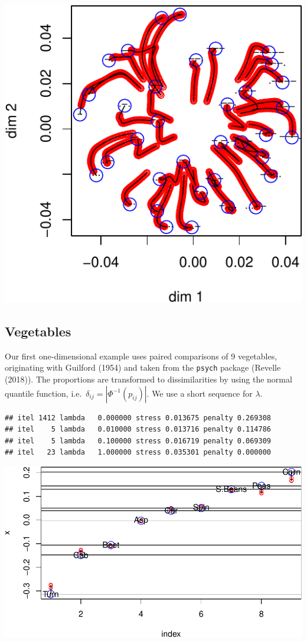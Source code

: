 \documentclass[
  12pt,
]{article}
\begin{document}
\begin{center}\includegraphics{penalty_files/figure-latex/morse-1} \end{center}

\subsection{Vegetables}\label{vegetables}

Our first one-dimensional example uses paired comparisons of 9
vegetables, originating with Guilford (1954) and taken from the
\texttt{psych} package (Revelle (2018)). The proportions are transformed
to dissimilarities by using the normal quantile function,
i.e.~\(\delta_{ij}=|\Phi^{-1}(p_{ij})|\). We use a short sequence for
\(\lambda\).

\begin{verbatim}
## itel 1412 lambda   0.000000 stress 0.013675 penalty 0.269308 
## itel    5 lambda   0.010000 stress 0.013716 penalty 0.114786 
## itel    5 lambda   0.100000 stress 0.016719 penalty 0.069309 
## itel   23 lambda   1.000000 stress 0.035301 penalty 0.000000
\end{verbatim}

\begin{center}\includegraphics{penalty_files/figure-latex/veg-1} \end{center}
\end{document}

